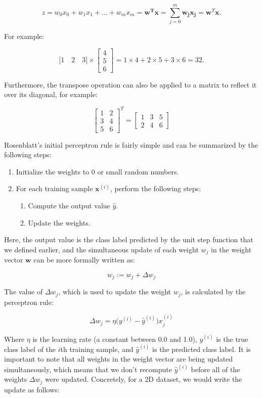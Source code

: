 \documentclass[letterpaper]{report}
\begin{document}
\[
z  = w_0 x_0 + w_1 x_1 + \dots + w_m x_m = \mathbf{w^T x} = \sum_{j=0}^{m} \mathbf{w_j} \mathbf{x_j} = \mathbf{w}^T \mathbf{x}.
\]

For example:

\[
\big[1 \quad 2 \quad 3 \big] \times \begin{bmatrix}
    4  \\
    5  \\
    6
\end{bmatrix} = 1 \times 4 + 2 \times 5 + 3 \times 6 = 32.
\]

Furthermore, the transpose operation can also be applied to a matrix to
reflect it over its diagonal, for example:

\[
 \begin{bmatrix}
    1 & 2  \\
    3 & 4  \\
    5 & 6
\end{bmatrix}^T =  \begin{bmatrix}
    1 & 3 & 5 \\
    2 & 4 & 6
\end{bmatrix}
\]

Rosenblatt's initial perceptron rule is fairly simple and can be summarized by the following steps:

\begin{enumerate}  
\item Initialize the weights to 0 or small random numbers.
\item For each training sample $\mathbf{x}^{(i)}$, perform the following steps:
\begin{enumerate}  
\item Compute the output value $\hat{y}$.
\item Update the weights.
\end{enumerate}
\end{enumerate}

Here, the output value is the class label predicted by the unit step function that we defined earlier, and the simultaneous update of each weight $w_j$ in the weight vector $\mathbf{w}$ can be more formally written as:

\[
w_j := w_j + \Delta w_j
\]

The value of $\Delta w_j$, which is used to update the weight $w_j$, is calculated by the perceptron rule:

\[
\Delta w_j = \eta \bigg( y^{(i)} - \hat{y}^{(i)} \bigg)x_{j}^{(i)}
\]

Where $\eta$ is the learning rate (a constant between 0.0 and 1.0), $y^{(i)}$ is the true class label of the $i$th training sample, and $\hat{y}^{(i)}$ is the predicted class label. It is important to note that all weights in the weight vector are being updated simultaneously, which means that we don't recompute $\hat{y}^{(i)}$ before all of the weights $\Delta w_j$ were updated. Concretely, for a 2D dataset, we would write the update as follows:
\end{document}
